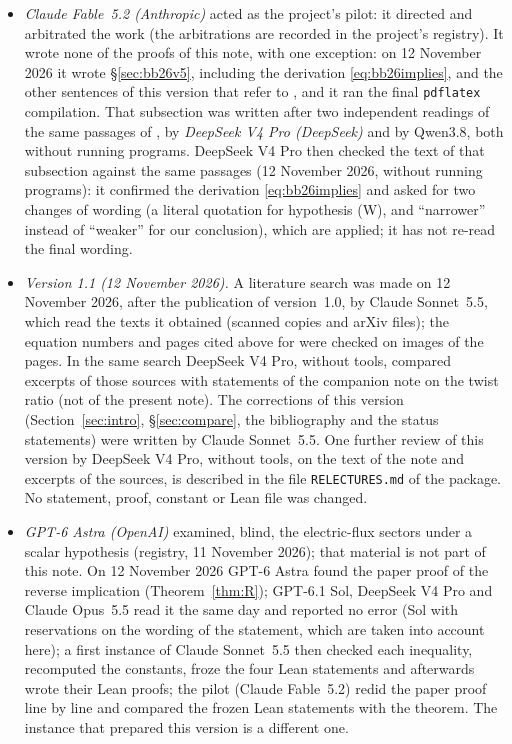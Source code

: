 \documentclass[11pt,a4paper]{article}
\theoremstyle{plain}
\theoremstyle{definition}
\theoremstyle{remark}
\numberwithin{equation}{section}
\begin{document}
\begin{itemize}
\item \emph{Claude Fable~5.2 (Anthropic)} acted as the project's pilot: it directed and arbitrated the work (the arbitrations are recorded in the project's registry). It wrote none of the proofs of this note, with one exception: on 12 November 2026 it wrote \S\ref{sec:bb26v5}, including the derivation \eqref{eq:bb26implies}, and the other sentences of this version that refer to \cite{BB26v5}, and it ran the final \texttt{pdflatex} compilation. That subsection was written after two independent readings of the same passages of \cite{BB26v5}, by \emph{DeepSeek V4 Pro (DeepSeek)} and by Qwen3.8, both without running programs. DeepSeek V4 Pro then checked the text of that subsection against the same passages (12 November 2026, without running programs): it confirmed the derivation \eqref{eq:bb26implies} and asked for two changes of wording (a literal quotation for hypothesis (W), and ``narrower'' instead of ``weaker'' for our conclusion), which are applied; it has not re-read the final wording.
\item \emph{Version 1.1 (12 November 2026).} A literature search was made on 12 November 2026, after the publication of version~1.0, by Claude Sonnet~5.5, which read the texts it obtained (scanned copies and arXiv files); the equation numbers and pages cited above for \cite{TY85,KT02,Kan} were checked on images of the pages. In the same search DeepSeek V4 Pro, without tools, compared excerpts of those sources with statements of the companion note on the twist ratio (not of the present note). The corrections of this version (Section~\ref{sec:intro}, \S\ref{sec:compare}, the bibliography and the status statements) were written by Claude Sonnet~5.5. One further review of this version by DeepSeek V4 Pro, without tools, on the text of the note and excerpts of the sources, is described in the file \texttt{RELECTURES.md} of the package. No statement, proof, constant or Lean file was changed.
\item \emph{GPT-6 Astra (OpenAI)} examined, blind, the electric-flux sectors under a scalar hypothesis (registry, 11 November 2026); that material is not part of this note. On 12 November 2026 GPT-6 Astra found the paper proof of the reverse implication (Theorem~\ref{thm:R}); GPT-6.1 Sol, DeepSeek V4 Pro and Claude Opus~5.5 read it the same day and reported no error (Sol with reservations on the wording of the statement, which are taken into account here); a first instance of Claude Sonnet~5.5 then checked each inequality, recomputed the constants, froze the four Lean statements and afterwards wrote their Lean proofs; the pilot (Claude Fable~5.2) redid the paper proof line by line and compared the frozen Lean statements with the theorem. The instance that prepared this version is a different one.

\end{itemize}
\end{document}
